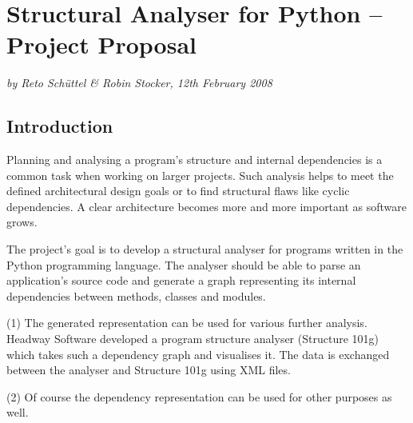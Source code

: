 \documentclass[12pt,halfparskip]{scrartcl}
\begin{document}
\pagestyle{plain}

\section*{Structural Analyser for Python – Project Proposal}
\vspace{-0.5cm}

\emph{by Reto Schüttel \& Robin Stocker, 12th February 2008}

\vspace{-0.3cm}

\subsection*{Introduction}

Planning and analysing a program's structure and internal dependencies is a common task when working on larger projects. Such analysis helps to meet the defined architectural design goals or to find structural flaws like cyclic dependencies. A clear architecture becomes more and more important as software grows.

The project's goal is to develop a structural analyser for programs written in the Python programming language. The analyser should be able to parse an application's source code and generate a graph representing its internal dependencies between methods, classes and modules. 

(1) The generated representation can be used for various further analysis. Headway Software developed a program structure analyser (Structure 101g) which takes such a dependency graph and visualises it. The data is exchanged between the analyser and Structure 101g using XML files.

(2) Of course the dependency representation can be used for other purposes as well.
\end{document}
